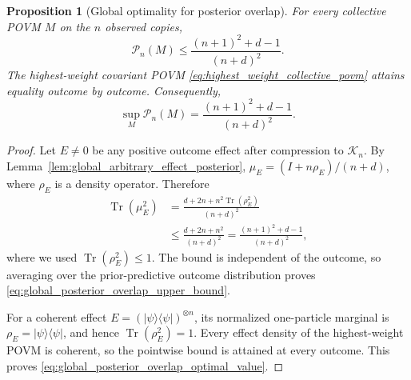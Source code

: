 \documentclass[journal]{IEEEtran}
\newtheorem{proposition}[theorem]{Proposition}
\newcommand{\ket}[1]{\lvert #1\rangle}
\newcommand{\bra}[1]{\langle #1\rvert}
\begin{document}
\begin{proposition}[Global optimality for posterior overlap]
\label{prop:global_posterior_overlap_optimality}
For every collective POVM \(M\) on the \(n\) observed copies,
\begin{equation}
    \mathcal P_n(M)
    \le
    \frac{(n+1)^2+d-1}{(n+d)^2}.
    \label{eq:global_posterior_overlap_upper_bound}
\end{equation}
The highest-weight covariant POVM
\eqref{eq:highest_weight_collective_povm} attains equality outcome by outcome.
Consequently,
\begin{equation}
    \sup_M \mathcal P_n(M)
    =
    \frac{(n+1)^2+d-1}{(n+d)^2}.
    \label{eq:global_posterior_overlap_optimal_value}
\end{equation}
\end{proposition}

\begin{proof}
Let \(E\ne0\) be any positive outcome effect after compression to
\(\mathcal K_n\).  By
Lemma~\ref{lem:global_arbitrary_effect_posterior},
\(
 \mu_E=(I+n\rho_E)/(n+d)
\), where \(\rho_E\) is a density operator.  Therefore
\begin{equation}
\begin{split}
    \operatorname{Tr}(\mu_E^2)
    &=
    \frac{
      d+2n+n^2\operatorname{Tr}(\rho_E^2)
    }{(n+d)^2}\\
    &\le
    \frac{d+2n+n^2}{(n+d)^2}
    =
    \frac{(n+1)^2+d-1}{(n+d)^2},
\end{split}
\label{eq:global_effect_purity_upper_bound}
\end{equation}
where we used \(\operatorname{Tr}(\rho_E^2)\le1\).  The bound is independent of
the outcome, so averaging over the prior-predictive outcome distribution proves
\eqref{eq:global_posterior_overlap_upper_bound}.

For a coherent effect
\(
 E=(\ket\psi\bra\psi)^{\otimes n}
\), its normalized one-particle marginal is
\(\rho_E=\ket\psi\bra\psi\), and hence
\(\operatorname{Tr}(\rho_E^2)=1\).  Every effect density of the highest-weight
POVM is coherent, so the pointwise bound is attained at every outcome.  This
proves \eqref{eq:global_posterior_overlap_optimal_value}.
\end{proof}
\end{document}
